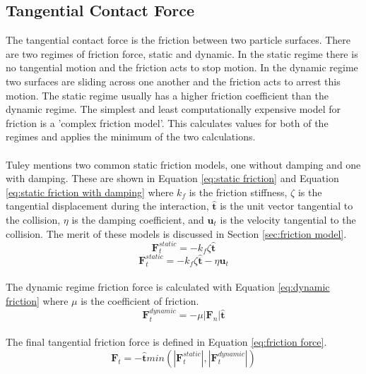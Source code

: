 \documentclass[a4paper,11pt,titlepage]{report}
\begin{document}
\subsection{Tangential Contact Force}
\label{sec:tangential contact force}
The tangential contact force is the friction between two particle surfaces. There are two regimes of friction force, static and dynamic. In the static regime there is no tangential motion and the friction acts to stop motion. In the dynamic regime two surfaces are sliding across one another and the friction acts to arrest this motion. The static regime usually has a higher friction coefficient than the dynamic regime. The simplest and least computationally expensive model for friction is a 'complex friction model'. This calculates values for both of the regimes and applies the minimum of the two calculations.\cite{tuley}
\\\\Tuley\cite{tuley} mentions two common static friction models, one without damping and one with damping. These are shown in Equation \ref{eq:static friction} and Equation \ref{eq:static friction with damping} where $k_f$ is the friction stiffness, $\zeta$ is the tangential displacement during the interaction, $\mathbf{\hat{t}}$ is the unit vector tangential to the collision, $\eta$ is the damping coefficient, and $\mathbf{u}_t$ is the velocity tangential to the collision. The merit of these models is discussed in Section \ref{sec:friction model}.
\begin{equation}
\mathbf{F}_{t}^{static} = - k_{f} \zeta \mathbf{\hat{t}}
\label{eq:static friction}
\end{equation}
\begin{equation}
\mathbf{F}_{t}^{static} = - k_{f} \zeta \mathbf{\hat{t}} - \eta \mathbf{u}_t
\label{eq:static friction with damping}
\end{equation}
\\The dynamic regime friction force is calculated with Equation \ref{eq:dynamic friction} where $\mu$ is the coefficient of friction.
\begin{equation}
\mathbf{F}_{t}^{dynamic} = - \mu |\mathbf{F}_{n}| \mathbf{\hat{t}}
\label{eq:dynamic friction}
\end{equation}
\\The final tangential friction force is defined in Equation \ref{eq:friction force}.
\begin{equation}
\mathbf{F}_{t} = -\mathbf{\hat{t}}min(|\mathbf{F}_{t}^{static}|, |\mathbf{F}_{t}^{dynamic}|)
\label{eq:friction force}
\end{equation}
\end{document}
